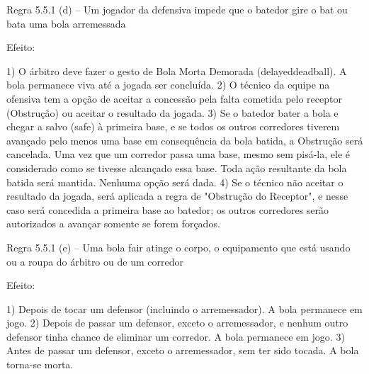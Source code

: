  Regra 5.5.1 (d) -- Um jogador da defensiva impede que o batedor gire o \gls{bat} ou bata uma bola arremessada

 Efeito:

	 1) O árbitro deve fazer o gesto de Bola Morta Demorada (\gls{delayeddeadball}).
	 A bola permanece viva até a jogada ser concluída.
	 2) O técnico da equipe na ofensiva tem a opção de aceitar a concessão pela falta cometida pelo receptor (Obstrução) ou aceitar o resultado da jogada.
	 3) Se o batedor bater a bola e chegar a salvo (\gls{safe}) à primeira base, e se todos os outros corredores tiverem avançado pelo menos uma base em consequência da bola batida, a Obstrução será cancelada. Uma vez que um corredor passa uma base, mesmo sem pisá-la, ele é considerado como se tivesse alcançado essa base. Toda ação resultante da bola batida será mantida. Nenhuma opção será dada.
	 4) Se o técnico não aceitar o resultado da jogada, será aplicada a regra de "Obstrução do Receptor", e nesse caso será concedida a primeira base ao batedor; os outros corredores serão autorizados a avançar somente se forem forçados.

 Regra 5.5.1 (e) -- Uma bola \gls{fair} atinge o corpo, o equipamento que está usando ou a roupa do árbitro ou de um corredor

 Efeito:

	 1) Depois de tocar um defensor (incluindo o arremessador). A bola permanece em jogo.
	 2) Depois de passar um defensor, exceto o arremessador, e nenhum outro defensor tinha chance de eliminar um corredor. A bola permanece em jogo.
	 3) Antes de passar um defensor, exceto o arremessador, sem ter sido tocada. A bola torna-se morta.

